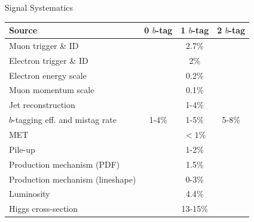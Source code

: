 \begin{frame}{Signal Systematics}
\begin{center}

\begin{tabular}{|l|c|c|c|}
\hline
Source      &   0 $b$-tag   &   1 $b$-tag  &   2 $b$-tag   \\ \hline \hline
Muon trigger \& ID               &  \multicolumn{3}{c|}{2.7\%}       \\
Electron trigger \& ID           &  \multicolumn{3}{c|}{2\%}         \\ \hline
Electron energy scale            &  \multicolumn{3}{c|}{0.2\%}       \\
Muon momentum scale              &  \multicolumn{3}{c|}{0.1\%}       \\ \hline
Jet reconstruction               &  \multicolumn{3}{c|}{1-4\%}       \\ \hline
$b$-tagging eff. and mistag rate &  1-4\% & 1-5\% & 5-8\%             \\ \hline
MET                              &  \multicolumn{3}{c|}{$<1$\%}       \\ \hline
Pile-up                          &  \multicolumn{3}{c|}{1-2\%}        \\
Production mechanism (PDF)       &  \multicolumn{3}{c|}{1.5\%}       \\
Production mechanism (lineshape) &  \multicolumn{3}{c|}{0-3\%}       \\
Luminosity                       &  \multicolumn{3}{c|}{4.4$\%$}      \\
Higgs cross-section              &  \multicolumn{3}{c|}{13-15$\%$ }  \\
\hline
\end{tabular}


\end{center}
\end{frame}
